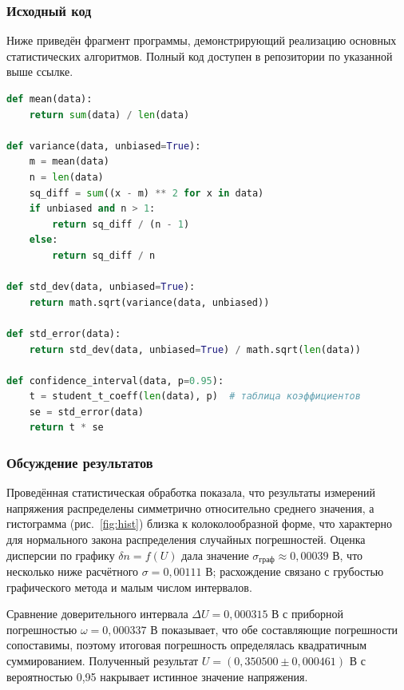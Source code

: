 

\subsubsection{Исходный код}

Ниже приведён фрагмент программы, демонстрирующий реализацию основных статистических алгоритмов. Полный код доступен в репозитории по указанной выше ссылке.

\begin{lstlisting}[label=listing:code, caption=Фрагмент программы на Python, language=Python]
def mean(data):
    return sum(data) / len(data)

def variance(data, unbiased=True):
    m = mean(data)
    n = len(data)
    sq_diff = sum((x - m) ** 2 for x in data)
    if unbiased and n > 1:
        return sq_diff / (n - 1)
    else:
        return sq_diff / n

def std_dev(data, unbiased=True):
    return math.sqrt(variance(data, unbiased))

def std_error(data):
    return std_dev(data, unbiased=True) / math.sqrt(len(data))

def confidence_interval(data, p=0.95):
    t = student_t_coeff(len(data), p)  # таблица коэффициентов
    se = std_error(data)
    return t * se
\end{lstlisting}

\subsubsection{Обсуждение результатов}

Проведённая статистическая обработка показала, что результаты измерений напряжения распределены симметрично относительно среднего значения, а гистограмма (рис.~\ref{fig:hist}) близка к колоколообразной форме, что характерно для нормального закона распределения случайных погрешностей. Оценка дисперсии по графику \(\delta n = f(U)\) дала значение \(\sigma_{\text{граф}} \approx 0,00039\) В, что несколько ниже расчётного \(\sigma = 0,00111\) В; расхождение связано с грубостью графического метода и малым числом интервалов.

Сравнение доверительного интервала \(\Delta U = 0,000315\) В с приборной погрешностью \(\omega = 0,000337\) В показывает, что обе составляющие погрешности сопоставимы, поэтому итоговая погрешность определялась квадратичным суммированием. Полученный результат \(U = (0,350500 \pm 0,000461)\) В с вероятностью 0,95 накрывает истинное значение напряжения.

